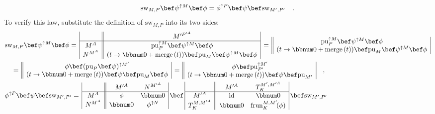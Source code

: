 ~\vspace{-0.4\baselineskip}
\begin{equation}
\text{sw}_{M,P}\bef\psi^{\uparrow M}\bef\phi=\phi^{\uparrow P}\bef\psi\bef\text{sw}_{M^{\prime},P^{\prime}}\quad.\label{eq:monadic-naturality-free-pointed-swap}
\end{equation}
To verify this law, substitute the definition of $\text{sw}_{M,P}$
into its two sides:
\begin{align*}
 & \text{sw}_{M,P}\bef\psi^{\uparrow M}\bef\phi=\,\begin{array}{|c||c|}
 & M^{\prime P^{\prime A}}\\
\hline M^{A} & \text{pu}_{P}^{\uparrow M}\bef\psi^{\uparrow M}\bef\phi\\
N^{M^{A}} & (t\rightarrow\bbnum 0+\text{merge}\,(t))\bef\text{pu}_{M}\bef\psi^{\uparrow M}\bef\phi
\end{array}\,=\,\begin{array}{||c|}
\text{pu}_{P}^{\uparrow M}\bef\psi^{\uparrow M}\bef\phi\\
(t\rightarrow\bbnum 0+\text{merge}\,(t))\bef\text{pu}_{M}\bef\psi^{\uparrow M}\bef\phi
\end{array}\\
 & \quad=\,\begin{array}{||c|}
\phi\bef(\text{pu}_{P}\bef\psi)^{\uparrow M^{\prime}}\\
(t\rightarrow\bbnum 0+\text{merge}\,(t))\bef\psi\bef\text{pu}_{M}\bef\phi
\end{array}\,=\,\begin{array}{||c|}
\phi\bef\text{pu}_{P^{\prime}}^{\uparrow M^{\prime}}\\
(t\rightarrow\bbnum 0+\text{merge}\,(t))\bef\psi\bef\text{pu}_{M^{\prime}}
\end{array}\quad,\\
 & \phi^{\uparrow P}\bef\psi\bef\text{sw}_{M^{\prime},P^{\prime}}=\,\begin{array}{|c||cc|}
 & M^{\prime A} & N^{M^{\prime A}}\\
\hline M^{A} & \phi & \bbnum 0\\
N^{M^{A}} & \bbnum 0 & \phi^{\uparrow N}
\end{array}\,\bef\,\begin{array}{|c||cc|}
 & M^{\prime A} & T_{K}^{M^{\prime},M^{\prime A}}\\
\hline M^{\prime A} & \text{id} & \bbnum 0\\
T_{K}^{M,M^{\prime A}} & \bbnum 0 & \text{frun}_{K}^{M,M^{\prime}}\!(\phi)
\end{array}\,\bef\text{sw}_{M^{\prime},P^{\prime}}\\

\end{align*}
